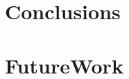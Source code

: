 \documentclass[main.tex]{subfiles}
\begin{document}
\section{Conclusions} \label{section:conclusions}

\section{FutureWork} \label{section:future}
\end{document}
